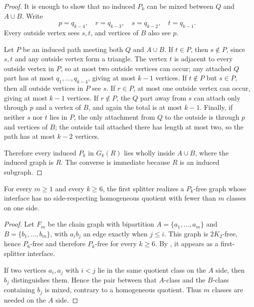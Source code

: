 \begin{proof}
It is enough to show that no induced $P_k$ can be mixed between $Q$ and $A\cup B$. Write
\[
  p=q_{k-4},\quad r=q_{k-3},\quad s=q_{k-2},\quad t=q_{k-1}.
\]
Every outside vertex sees $s,t$, and vertices of $B$ also see $p$.

Let $P$ be an induced path meeting both $Q$ and $A\cup B$. If $t\in P$, then $s\notin P$, since $s,t$ and any outside vertex form a triangle. The vertex $t$ is adjacent to every outside vertex in $P$, so at most two outside vertices can occur; any attached $Q$ part has at most $q_1,\dots,q_{k-4}$, giving at most $k-1$ vertices. If $t\notin P$ but $s\in P$, then all outside vertices in $P$ see $s$. If $r\in P$, at most one outside vertex can occur, giving at most $k-1$ vertices. If $r\notin P$, the $Q$ part away from $s$ can attach only through $p$ and a vertex of $B$, and again the total is at most $k-1$. Finally, if neither $s$ nor $t$ lies in $P$, the only attachment from $Q$ to the outside is through $p$ and vertices of $B$; the outside tail attached there has length at most two, so the path has at most $k-2$ vertices.

Therefore every induced $P_k$ in $G_k(R)$ lies wholly inside $A\cup B$, where the induced graph is $R$. The converse is immediate because $R$ is an induced subgraph.
\end{proof}

\begin{proposition}\label{prop:chain-quotients}
For every $m\ge 1$ and every $k\ge 6$, the first splitter realizes a $P_k$-free graph whose interface has no side-respecting homogeneous quotient with fewer than $m$ classes on one side.
\end{proposition}

\begin{proof}
Let $F_m$ be the chain graph with bipartition $A=\{a_1,\dots,a_m\}$ and $B=\{b_1,\dots,b_m\}$, with $a_i b_j$ an edge exactly when $j\le i$. This graph is $2K_2$-free, hence $P_6$-free and therefore $P_k$-free for every $k\ge 6$. By , it appears as a first-splitter interface.

If two vertices $a_i,a_j$ with $i<j$ lie in the same quotient class on the $A$ side, then $b_j$ distinguishes them. Hence the pair between that $A$-class and the $B$-class containing $b_j$ is mixed, contrary to a homogeneous quotient. Thus $m$ classes are needed on the $A$ side.
\end{proof}

